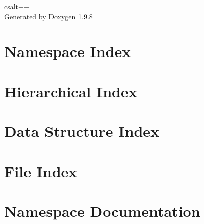 \documentclass[twoside]{book}
\newcommand{\+}{\discretionary{\mbox{\scriptsize$\hookleftarrow$}}{}{}}
\newcommand{\clearemptydoublepage}{%
    \newpage{\pagestyle{empty}\cleardoublepage}%
  }
\begin{document}
  \raggedbottom
    \hypersetup{pageanchor=false,
                bookmarksnumbered=true,
                pdfencoding=unicode
               }
  \begin{titlepage}
  \vspace*{7cm}
  \begin{center}%
  {\Large csalt++}\\
  \vspace*{1cm}
  {\large Generated by Doxygen 1.9.8}\\
  \end{center}
  \end{titlepage}
  \clearemptydoublepage
  \tableofcontents
  \clearemptydoublepage
  \hypersetup{pageanchor=true}

\chapter{Namespace Index}

\chapter{Hierarchical Index}

\chapter{Data Structure Index}

\chapter{File Index}

\chapter{Namespace Documentation}


\end{document}
